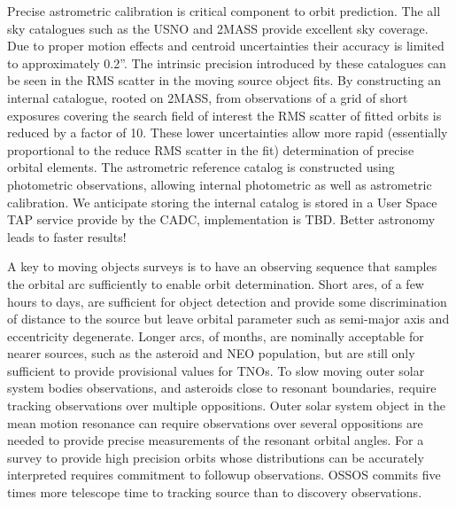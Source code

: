 \documentclass[11pt,twoside]{article}
\begin{document}
Precise astrometric calibration is critical component to orbit prediction.
The all sky catalogues such as the USNO and 2MASS provide excellent sky coverage.
Due to proper motion effects and centroid uncertainties their accuracy  is limited to approximately 0.2''.
The intrinsic precision introduced by these catalogues can be seen in the RMS scatter in the moving source object fits. 
By constructing an internal catalogue, rooted on 2MASS, from observations of a grid of short exposures covering the search field of interest the RMS scatter of fitted orbits is reduced by a factor of 10.
These lower uncertainties allow more rapid (essentially proportional to the reduce RMS scatter in the fit) determination of precise orbital elements.
The astrometric reference catalog is constructed using photometric observations, allowing internal photometric as well as astrometric calibration.
We anticipate storing the internal catalog is stored in a User Space TAP service provide by the CADC, implementation is TBD. 
Better astronomy leads to faster results!


A key to moving objects surveys is to have an observing sequence that samples the orbital arc sufficiently to enable orbit determination.
Short ares, of a few hours to days, are sufficient for object detection and provide some discrimination of distance to the source but leave orbital parameter such as semi-major axis and eccentricity degenerate. 
Longer arcs, of months, are nominally acceptable for nearer sources, such as the asteroid and NEO population, but are still only sufficient to provide provisional values for TNOs.
To slow moving outer solar system bodies observations, and asteroids close to resonant boundaries, require tracking observations over multiple oppositions.  
Outer solar system object in the mean motion resonance can require observations over several oppositions are needed to provide precise measurements of the resonant orbital angles.  
For a survey to provide high precision orbits whose distributions can be accurately interpreted requires commitment to followup observations.  
OSSOS commits five times more telescope time to tracking source than to discovery observations. 
\end{document}
